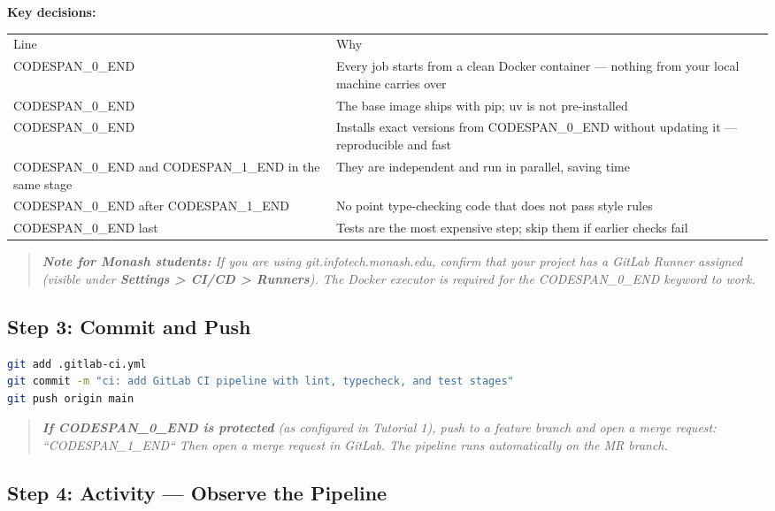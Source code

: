 \documentclass[11pt,a4paper]{book}
\begin{document}
\textbf{Key decisions:}

\begin{tabular}{ll}
\hline
Line & Why \\
CODESPAN\_0\_END & Every job starts from a clean Docker container --- nothing from your local machine carries over \\
CODESPAN\_0\_END & The base image ships with pip; uv is not pre-installed \\
CODESPAN\_0\_END & Installs exact versions from CODESPAN\_0\_END without updating it --- reproducible and fast \\
CODESPAN\_0\_END and CODESPAN\_1\_END in the same stage & They are independent and run in parallel, saving time \\
CODESPAN\_0\_END after CODESPAN\_1\_END & No point type-checking code that does not pass style rules \\
CODESPAN\_0\_END last & Tests are the most expensive step; skip them if earlier checks fail \\
\hline
\end{tabular}

\begin{quote}
\textit{\textbf{Note for Monash students:} If you are using git.infotech.monash.edu, confirm that your project has a GitLab Runner assigned (visible under \textbf{Settings > CI/CD > Runners}). The Docker executor is required for the CODESPAN\_0\_END keyword to work.}
\end{quote}

\medskip

\subsection{Step 3: Commit and Push}

\begin{lstlisting}[language=Bash]
git add .gitlab-ci.yml
git commit -m "ci: add GitLab CI pipeline with lint, typecheck, and test stages"
git push origin main
\end{lstlisting}

\begin{quote}
\textit{\textbf{If CODESPAN\_0\_END is protected} (as configured in Tutorial 1), push to a feature branch and open a merge request: ``CODESPAN\_1\_END`` Then open a merge request in GitLab. The pipeline runs automatically on the MR branch.}
\end{quote}

\medskip

\subsection{Step 4: Activity --- Observe the Pipeline}
\end{document}
